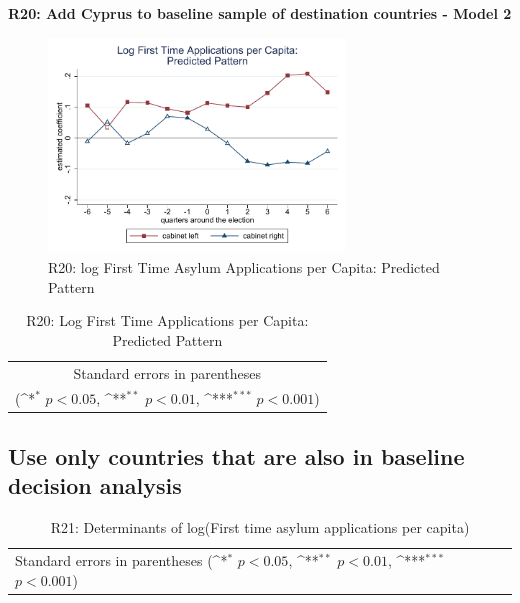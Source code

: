 \documentclass[10pt,a4paper]{scrartcl}
\begin{document}
\clearpage
\textbf{R20: Add Cyprus to baseline sample of destination countries - Model 2}
\begin{figure}[!ht]
	\centering
	\includegraphics[width=0.7\textwidth]{figures_edited/app_graph2_R20.pdf}
	\caption{R20: log First Time Asylum Applications per Capita: Predicted Pattern}
\end{figure}

\begin{table}[!ht]\centering
	\footnotesize
	\renewcommand{\arraystretch}{1.2}
	\def\sym#1{\ifmmode^{#1}\else\(^{#1}\)\fi}
	\caption{R20: Log First Time Applications per Capita: Predicted Pattern}
	\begin{tabular}{l*{2}{c}}
		\hline\hline
		
		\hline\hline
		\multicolumn{3}{c}{\footnotesize Standard errors in parentheses} \\
		\multicolumn{3}{c}{\footnotesize (\sym{*} \(p<0.05\), \sym{**} \(p<0.01\), \sym{***} \(p<0.001\))} \\
	\end{tabular}
\end{table}






\clearpage
\FloatBarrier
\subsection{Use only countries that are also in baseline decision analysis}
\begin{table}[!ht]\centering
	\renewcommand{\arraystretch}{1.25}
	\small
	\def\sym#1{\ifmmode^{#1}\else\(^{#1}\)\fi}
	\caption{R21: Determinants of log(First time asylum applications per capita)}
	\begin{tabular}{l*{3}{c}}
		\hline\hline
		
		\hline\hline
		\multicolumn{4}{l}{\footnotesize Standard errors in parentheses (\sym{*} \(p<0.05\), \sym{**} \(p<0.01\), \sym{***} \(p<0.001\))}\\
	\end{tabular}
\end{table}
\end{document}
